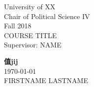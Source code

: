 


\begin{titlepage} %

	
\begin{minipage}{0.4\textwidth} %
    \begin{flushleft} %
    \large
    University of XX\\ %
    Chair of Political Science IV\\ %
    Fall 2018\\ %
    COURSE TITLE\\ %
    Supervisor: NAME %
    \end{flushleft}
\end{minipage}
	
\vspace*{2in} %
	
\center %

	
{\huge\bfseries 值jij}\\[0.4cm] %
{\large\today}\\[0.4cm] %
FIRSTNAME LASTNAME %
	
\vfill %


\vfill %


\end{titlepage}
